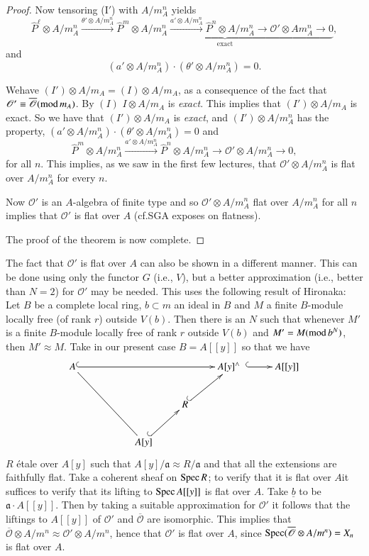 \begin{proof}
Now tensoring (I$'$) with $A/m^{n}_{A}$ yields
$$
\hat{P}^{\ell}\otimes A/m^{n}_{A}\xrightarrow{\theta'\otimes
  A/m^{n}_{A}}\underbrace{\hat{P}^{m}\otimes
  A/m^{n}_{A}\xrightarrow{a'\otimes A/m^{n}_{A}}\hat{P}^{n}\otimes
  A/m^{n}_{A}\to \mathscr{O}'\otimes Am^{n}_{A}\to 0}_{\text{exact}},
$$
and
$$
(a'\otimes A/m^{n}_{A})\cdot (\theta'\otimes A/m^{n}_{A})=0.
$$

We\pageoriginale have $(I')\otimes A/m_{A}=(I)\otimes A/m_{A}$, as a
consequence of the fact that $\mathscr{O}'\equiv
\overline{\mathscr{O}}(\text{mod\,}m_{A})$. By $(I)$ $I\otimes
A/m_{A}$ is {\em exact}. This implies that $(I')\otimes A/m_{A}$ is
exact. So we have that $(I')\otimes A/m_{A}$ is {\em exact}, and
$(I')\otimes A/m^{n}_{A}$ has the property, $(a'\otimes
A/m^{n}_{A})\cdot (\theta'\otimes A/m^{n}_{A})=0$ and
$$
\hat{P}^{m}\otimes A/m^{n}_{A}\xrightarrow{a'\otimes
  A/m^{n}_{A}}\hat{P}^{n}\otimes A/m^{n}_{A}\to \mathscr{O}'\otimes
A/m^{n}_{A}\to 0,
$$
for all $n$. This implies, as we saw in the first few lectures, that
$\mathscr{O}'\otimes A/m^{n}_{A}$ is flat over $A/m^{n}_{A}$ for every
$n$.

Now $\mathscr{O}'$ is an $A$-algebra of finite type and so
$\mathscr{O}'\otimes A/m^{n}_{A}$ flat over $A/m^{n}_{A}$ for all $n$
implies that $\mathscr{O}'$ is flat over $A$ (cf.\@ SGA exposes on
flatness). 

The proof of the theorem is now complete.
\end{proof}

\begin{remark}\label{part2-rem5.1}
The fact that $\mathscr{O}'$ is flat over $A$ can also be shown in a
different manner. This can be done using only the functor $G$ (i.e.,
$V$), but a better approximation (i.e., better than $N=2$) for
$\mathscr{O}'$ may be needed. This uses the following result of
Hironaka: Let $B$ be a complete local ring, $b\subset m$ an ideal in
$B$ and $M$ a finite $B$-module locally free (of rank $r$) outside
$V(b)$. Then there is an $N$ such that whenever $M'$ is a finite
$B$-module locally free of rank $r$ outside $V(b)$ and
$M'=M(\text{mod\,}b^{N})$, then $M'\approx M$. Take in our present
case $B=A[[y]]$ so that we have
\[
\xymatrix{
A\ar@{-}[ddrr]\ar@{^{(}->}[rrrr] && & & A[y]^{\wedge} \;\; \ar@{^{(}->}[r] &
A[[y]]\\
 & && R\ar@{^{(}->}[ur] & &\\
&& A[y]\ar@{^{(}->}[ur] & & &
}
\]
$R$ \'etale over $A[y]$ such that $A[y]/\mathfrak{a}\approx
R/\mathfrak{a}$ and that all the extensions are faithfully flat. Take
a coherent sheaf on $\operatorname{Spec} R$; to verify that it is flat over
$A$\pageoriginale it suffices to verify that its lifting to $\operatorname{Spec}
A[[y]]$ is flat over $A$. Take $\underline{b}$ to be
$\mathfrak{a}\cdot A[[y]]$. Then by taking a suitable approximation
for $\mathscr{O}'$ it follows that the liftings to $A[[y]]$ of
$\mathscr{O}'$ and $\overline{\mathscr{O}}$ are isomorphic. This
implies that $\overline{\mathscr{O}}\otimes A/m^{n}\approx \mathscr{O}'\otimes
A/m^{n}$, hence that $\mathscr{O}'$ is flat over $A$, since $\operatorname{Spec}
(\overline{\mathscr{O}}\otimes A/m^{n})=X_{n}$ is flat over $A$. 
\end{remark}
